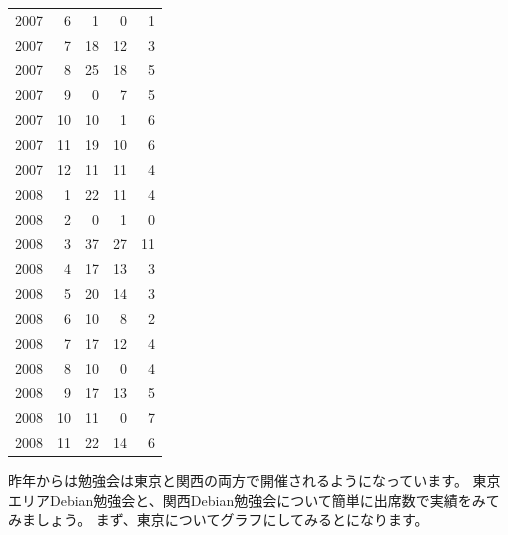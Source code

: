 \documentclass[mingoth,a4paper]{jsarticle}
\begin{document}
\begin{commandline}
\begin{table}[ht]
\begin{minipage}{0.5\hsize}
\begin{tabular}{|l|r|r|r|r|}
 2007 & 6 & 1 & 0 & 1\\
 2007 & 7 & 18 & 12 & 3\\
 2007 & 8 & 25 & 18 & 5\\
 2007 & 9 & 0 & 7 & 5\\
 2007 & 10 & 10 & 1 & 6\\
 2007 & 11 & 19 & 10 & 6\\
 2007 & 12 & 11 & 11 & 4\\
 2008 & 1 & 22 & 11 & 4\\
 2008 & 2 & 0 & 1 & 0\\
 2008 & 3 & 37 & 27 & 11\\
 2008 & 4 & 17 & 13 & 3\\
 2008 & 5 & 20 & 14 & 3\\
 2008 & 6 & 10 & 8 & 2\\
 2008 & 7 & 17 & 12 & 4\\
 2008 & 8 & 10 & 0 & 4\\
 2008 & 9 & 17 & 13 & 5\\
 2008 & 10 & 11 & 0 & 7\\
 2008 & 11 & 22 & 14 & 6\\
\end{tabular}
\end{minipage}

\end{table}

昨年からは勉強会は東京と関西の両方で開催されるようになっています。
東京エリアDebian勉強会と、関西Debian勉強会について簡単に出席数で実績をみてみましょう。
まず、東京についてグラフにしてみるとになります。


\end{commandline}
\end{document}
